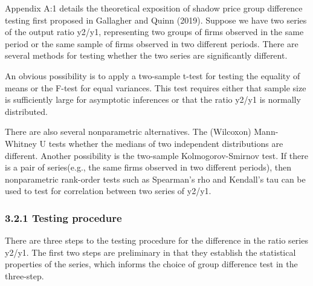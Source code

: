\documentclass[
  10pt,
]{article}
\begin{document}
Appendix A:1 details the theoretical exposition of shadow price group
difference testing first proposed in Gallagher and Quinn (2019). Suppose
we have two series of the output ratio y2/y1, representing two groups of
firms observed in the same period or the same sample of firms observed
in two different periods. There are several methods for testing whether
the two series are significantly different.

An obvious possibility is to apply a two-sample t-test for testing the
equality of means or the F-test for equal variances. This test requires
either that sample size is sufficiently large for asymptotic inferences
or that the ratio y2/y1 is normally distributed.

There are also several nonparametric alternatives. The (Wilcoxon)
Mann-Whitney U tests whether the medians of two independent
distributions are different. Another possibility is the two-sample
Kolmogorov-Smirnov test. If there is a pair of series(e.g., the same
firms observed in two different periods), then nonparametric rank-order
tests such as Spearman's rho and Kendall's tau can be used to test for
correlation between two series of y2/y1.

\hypertarget{testing-procedure}{%
\subsubsection{3.2.1 Testing procedure}\label{testing-procedure}}

There are three steps to the testing procedure for the difference in the
ratio series y2/y1. The first two steps are preliminary in that they
establish the statistical properties of the series, which informs the
choice of group difference test in the three-step.
\end{document}
